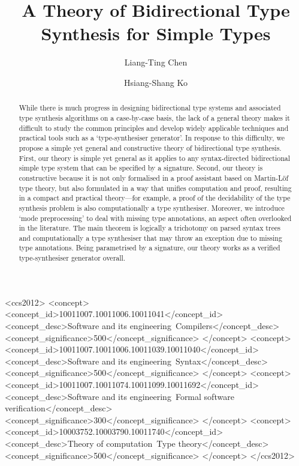 \documentclass[acmsmall,screen]{acmart}
\theoremstyle{acmdefinition}
\begin{document}
\author{Liang-Ting Chen}
\author{Hsiang-Shang Ko}

\title{A Theory of Bidirectional Type Synthesis for Simple Types}

\begin{abstract}
  While there is much progress in designing bidirectional type systems and associated type synthesis algorithms on a case-by-case basis, the lack of a general theory makes it difficult to study the common principles and develop widely applicable techniques and practical tools such as a `type-synthesiser generator'.
  In response to this difficulty, we propose a simple yet general and constructive theory of bidirectional type synthesis.
  First, our theory is simple yet general as it applies to any syntax-directed bidirectional simple type system that can be specified by a signature.
  Second, our theory is constructive because it is not only formalised in a proof assistant based on Martin-L\"of type theory, but also formulated in a way that unifies computation and proof, resulting in a compact and practical theory---for example, a proof of the decidability of the type synthesis problem is also computationally a type synthesiser.
  Moreover, we introduce `mode preprocessing' to deal with missing type annotations, an aspect often overlooked in the literature.
  The main theorem is logically a trichotomy on parsed syntax trees and computationally a type synthesiser that may throw an exception due to missing type annotations.
  Being parametrised by a signature, our theory works as a verified type-synthesiser generator overall.
\end{abstract}

\begin{CCSXML}
<ccs2012>
   <concept>
       <concept_id>10011007.10011006.10011041</concept_id>
       <concept_desc>Software and its engineering~Compilers</concept_desc>
       <concept_significance>500</concept_significance>
       </concept>
   <concept>
       <concept_id>10011007.10011006.10011039.10011040</concept_id>
       <concept_desc>Software and its engineering~Syntax</concept_desc>
       <concept_significance>500</concept_significance>
       </concept>
   <concept>
       <concept_id>10011007.10011074.10011099.10011692</concept_id>
       <concept_desc>Software and its engineering~Formal software verification</concept_desc>
       <concept_significance>300</concept_significance>
       </concept>
   <concept>
       <concept_id>10003752.10003790.10011740</concept_id>
       <concept_desc>Theory of computation~Type theory</concept_desc>
       <concept_significance>500</concept_significance>
       </concept>
 </ccs2012>
\end{CCSXML}
\end{document}
